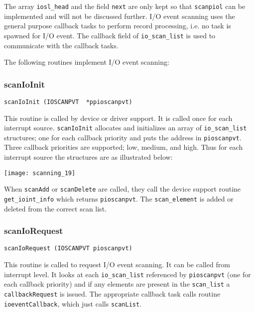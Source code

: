 The array \verb|iosl_head| and the field \verb|next| are only kept so that \verb|scanpiol| can be implemented and will not be discussed further.
I/O event scanning uses the general purpose callback tasks to perform record processing, i.e. no task is spawned for I/O event.
The callback field of \verb|io_scan_list| is used to communicate with the callback tasks.

The following routines implement I/O event scanning:

\subsubsection{scanIoInit}

\begin{verbatim}
scanIoInit (IOSCANPVT  *ppioscanpvt)
\end{verbatim}

This routine is called by device or driver support.
It is called once for each interrupt source.
\verb|scanIoInit| allocates and initializes an array of \verb|io_scan_list| structures; one for each callback priority and puts the address in \verb|pioscanpvt|.
Three callback priorities are supported; low, medium, and high.
Thus for each interrupt source the structures are as illustrated below:

\begin{center}
\texttt{[image: scanning\_19]}
\end{center}

When \verb|scanAdd| or \verb|scanDelete| are called, they call the device support routine \verb|get_ioint_info| which returns \verb|pioscanpvt|.
The \verb|scan_element| is added or deleted from the correct scan list.

\subsubsection{scanIoRequest}

\begin{verbatim}
scanIoRequest (IOSCANPVT pioscanpvt)
\end{verbatim}

This routine is called to request I/O event scanning.
It can be called from interrupt level.
It looks at each \verb|io_scan_list| referenced by \verb|pioscanpvt| (one for each callback priority) and if any elements are present in the \verb|scan_list| a \verb|callbackRequest| is issued.
The appropriate callback task calls routine \verb|ioeventCallback|, which just calls \verb|scanList|. 

